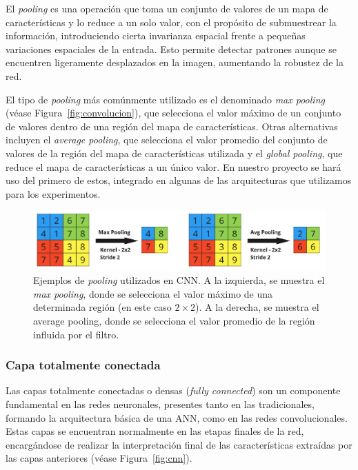 El \textit{pooling} es una operación que toma un conjunto de valores de un mapa de características y lo reduce a un solo valor, con el propósito de submuestrear la información, introduciendo cierta invarianza espacial frente a pequeñas variaciones espaciales de la entrada. Esto permite detectar patrones aunque se encuentren ligeramente desplazados en la imagen, aumentando la robustez de la red.

El tipo de \textit{pooling} más comúnmente utilizado es el denominado \emph{max pooling} (véase Figura~\ref{fig:convolucion}), que selecciona el valor máximo de un conjunto de valores dentro de una región del mapa de características. Otras alternativas incluyen el \emph{average pooling}, que selecciona el valor promedio del conjunto de valores de la región del mapa de características utilizada y el \emph{global pooling}, que reduce el mapa de características a un único valor. En nuestro proyecto se hará uso del primero de estos, integrado en algunas de las arquitecturas que utilizamos para los experimentos.

\begin{figure}[h]
    \centering
    \includegraphics[width=0.8\linewidth]{img/pooling.png}
    \caption[Ejemplos de \textit{pooling} utilizados en CNN.]{Ejemplos de \textit{pooling} utilizados en CNN. A la izquierda, se muestra el \textit{max pooling}, donde se selecciona el valor máximo de una determinada región (en este caso $2 \times 2$). A la derecha, se muestra el average pooling, donde se selecciona el valor promedio de la región influida por el filtro.}\label{fig:pooling}
\end{figure}

\subsubsection{Capa totalmente conectada}

Las capas totalmente conectadas o densas (\emph{fully connected}) son un componente fundamental en las redes neuronales, presentes tanto en las tradicionales, formando la arquitectura básica de una ANN, como en las redes convolucionales. Estas capas se encuentran normalmente en las etapas finales de la red, encargándose de realizar la interpretación final de las características extraídas por las capas anteriores (véase Figura~\ref{fig:cnn}).

